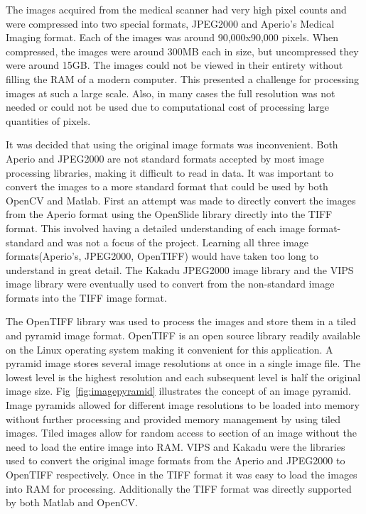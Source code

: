 \documentclass[letterpaper,10pt,oneside]{article}
\begin{document}
The images acquired from the medical scanner had very high pixel counts and were compressed into two special formats, JPEG2000 and Aperio's Medical Imaging format. Each of the images was around 90,000x90,000 pixels. When compressed, the images were around 300MB each in size, but uncompressed they were around 15GB. The images could not be viewed in their entirety without filling the RAM of a modern computer. This presented a challenge for processing images at such a large scale. Also, in many cases the full resolution was not needed or could not be used due to computational cost of processing large quantities of pixels.

It was decided that using the original image formats was inconvenient. Both Aperio and JPEG2000 are not standard formats accepted by most image processing libraries, making it difficult to read in data. It was important to convert the images to a more standard format that could be used by both OpenCV and Matlab. First an attempt was made to directly convert the images from the Aperio format using the OpenSlide library directly into the TIFF format. This involved having a detailed understanding of each image format-standard and was not a focus of the project. Learning all three image formats(Aperio's, JPEG2000, OpenTIFF) would have taken too long to understand in great detail. The Kakadu JPEG2000 image library and the VIPS image library were eventually used to convert from the non-standard image formats into the TIFF image format.

The OpenTIFF library was used to process the images and store them in a tiled and pyramid image format. OpenTIFF is an open source library readily available on the Linux operating system making it convenient for this application. A pyramid image stores several image resolutions at once in a single image file. The lowest level is the highest resolution and each subsequent level is half the original image size. Fig~\ref{fig:imagepyramid} illustrates the concept of an image pyramid. Image pyramids allowed for different image resolutions to be loaded into memory without further processing and provided memory management by using tiled images. Tiled images allow for random access to section of an image without the need to load the entire image into RAM. VIPS and Kakadu were the libraries used to convert the original image formats from the Aperio and JPEG2000 to OpenTIFF respectively. Once in the TIFF format it was easy to load the images into RAM for processing. Additionally the TIFF format was directly supported by both Matlab and OpenCV.
\end{document}
